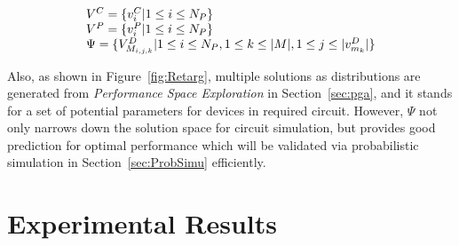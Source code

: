     \begin{align}{\label{eq:FullReTarg}}
      \begin{array}{l}
        V^C = \{v^C_i| 1 \leq i \leq N_P\}\\
        V^P = \{v^P_i| 1 \leq i \leq N_P\}\\
        \Psi =  \{V^D_{M_{i,j,k}}| 1\leq i \leq N_P, 1 \leq k \leq |M|, 1 \leq j \leq |v^D_{m_k}|\} 
      \end{array}
    \end{align}

    Also, as shown in Figure~\ref{fig:Retarg}, multiple solutions as distributions are generated from {\it Performance Space Exploration} in Section~\ref{sec:pga}, and it stands for a set of potential parameters for devices in required circuit. However, $\Psi$ not only narrows down the solution space for circuit simulation, but provides good prediction for optimal performance which will be validated via probabilistic simulation in Section~\ref{sec:ProbSimu} efficiently. 

  

  \section{Experimental Results}\label{sec:PAGEExp}

